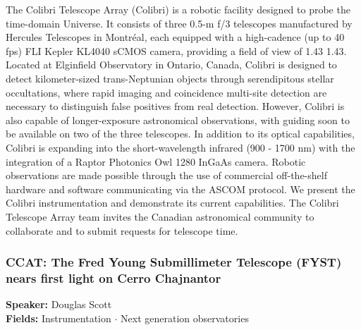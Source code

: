 The Colibri Telescope Array (Colibri) is a robotic facility designed to probe the time-domain Universe. It consists of three 0.5-m f/3 telescopes manufactured by Hercules Telescopes in Montréal, each equipped with a high-cadence (up to 40 fps) FLI Kepler KL4040 sCMOS camera, providing a field of view of 1.43 1.43. Located at Elginfield Observatory in Ontario, Canada, Colibri is designed to detect kilometer-sized trans-Neptunian objects through serendipitous stellar occultations, where rapid imaging and coincidence multi-site detection are necessary to distinguish false positives from real detection. However, Colibri is also capable of longer-exposure astronomical observations, with guiding soon to be available on two of the three telescopes. In addition to its optical capabilities, Colibri is expanding into the short-wavelength infrared (900 - 1700 nm) with the integration of a Raptor Photonics Owl 1280 InGaAs camera. Robotic observations are made possible through the use of commercial off-the-shelf hardware and software communicating via the ASCOM protocol. We present the Colibri instrumentation and demonstrate its current capabilities. The Colibri Telescope Array team invites the Canadian astronomical community to collaborate and to submit requests for telescope time.

\hypertarget{abstract-talk-156}{}\label{abstract-page-talk-156}
\subsubsection*{CCAT: The Fred Young Submillimeter Telescope (FYST) nears first light on Cerro Chajnantor}
\textbf{Speaker:} Douglas Scott\\
\textbf{Fields:} Instrumentation $\cdot$ Next generation observatories

